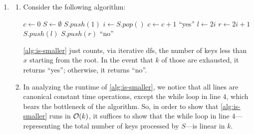 \documentclass{article}
\begin{document}
\begin{enumerate}[leftmargin={*}, font={\bf}, label={\arabic*.}, ref={\arabic*}]
  \item \label{qst:1}
    \begin{enumerate}
      \item \label{qst:1a}
        Consider the following algorithm: \vspace{-\baselineskip}
        
        \begin{minipage}{\linewidth}
          \begin{algorithm}[H]
            \caption{$\textsc{Is-Smaller}(A,x,k)$}\label{alg:is-smaller}
            \begin{algorithmic}[1]
              \State $c \gets 0$ 
              \State $S \gets \emptyset$ 
              \State $S.push(1)$ 
                \State $i \gets S.pop()$
                  \State $c \gets c + 1$
                    \State \Return ``yes''
                  \EndIf
                  \State $l \gets 2i$
                  \State $r \gets 2i + 1$
                    \State $S.push(l)$
                  \EndIf
                    \State $S.push(r)$
                  \EndIf
                \EndIf
              \EndWhile
              \State \Return ``no''
            \end{algorithmic}
          \end{algorithm}
        \end{minipage}

        \autoref{alg:is-smaller} just counts, via iterative {\sc dfs}, the number of keys
        less than $x$ starting from the root. In the event that $k$ of those are exhausted,
        it returns ``yes''; otherwise, it returns ``no''.

      \item \label{qst:1b}
        In analyzing the runtime of \autoref{alg:is-smaller}, we notice that all lines are
        canonical constant time operations, except the while loop in line $4$, which bears
        the bottleneck of the algorithm. So, in order to show that \autoref{alg:is-smaller}
        runs in $\operatorname*{\mathcal{O}}(k)$, it suffices to show that the while loop in line $4$---representing
        the total number of keys processed by $S$---is linear in $k$.


\end{enumerate}
\end{enumerate}
\end{document}
